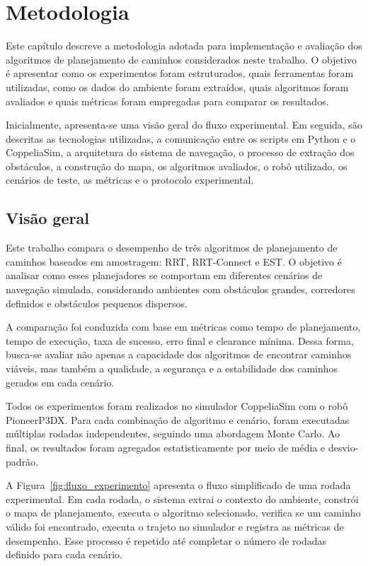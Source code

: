 \chapter{Metodologia}\label{cap:metodologia}

Este capítulo descreve a metodologia adotada para implementação e avaliação dos algoritmos de planejamento de caminhos considerados neste trabalho. O objetivo é apresentar como os experimentos foram estruturados, quais ferramentas foram utilizadas, como os dados do ambiente foram extraídos, quais algoritmos foram avaliados e quais métricas foram empregadas para comparar os resultados.

Inicialmente, apresenta-se uma visão geral do fluxo experimental. Em seguida, são descritas as tecnologias utilizadas, a comunicação entre os scripts em Python e o CoppeliaSim, a arquitetura do sistema de navegação, o processo de extração dos obstáculos, a construção do mapa, os algoritmos avaliados, o robô utilizado, os cenários de teste, as métricas e o protocolo experimental.

\section{Visão geral}
\label{sec:metodologia_visao_geral}

Este trabalho compara o desempenho de três algoritmos de planejamento de caminhos baseados em amostragem: RRT, RRT-Connect e EST. O objetivo é analisar como esses planejadores se comportam em diferentes cenários de navegação simulada, considerando ambientes com obstáculos grandes, corredores definidos e obstáculos pequenos dispersos.

A comparação foi conduzida com base em métricas como tempo de planejamento, tempo de execução, taxa de sucesso, erro final e clearance mínima. Dessa forma, busca-se avaliar não apenas a capacidade dos algoritmos de encontrar caminhos viáveis, mas também a qualidade, a segurança e a estabilidade dos caminhos gerados em cada cenário.

Todos os experimentos foram realizados no simulador CoppeliaSim com o robô PioneerP3DX. Para cada combinação de algoritmo e cenário, foram executadas múltiplas rodadas independentes, seguindo uma abordagem Monte Carlo. Ao final, os resultados foram agregados estatisticamente por meio de média e desvio-padrão.

A Figura~\ref{fig:fluxo_experimento} apresenta o fluxo simplificado de uma rodada experimental. Em cada rodada, o sistema extrai o contexto do ambiente, constrói o mapa de planejamento, executa o algoritmo selecionado, verifica se um caminho válido foi encontrado, executa o trajeto no simulador e registra as métricas de desempenho. Esse processo é repetido até completar o número de rodadas definido para cada cenário.

